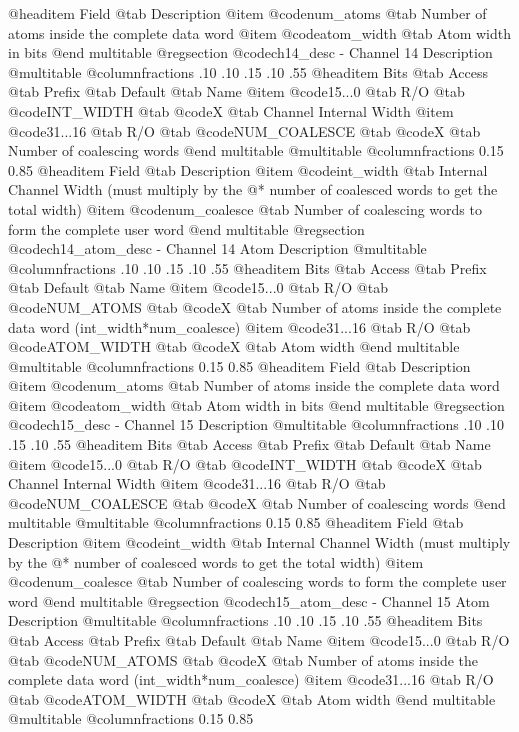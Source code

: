 @headitem Field @tab Description
@item @code{num_atoms} @tab Number of atoms inside the complete data word
@item @code{atom_width} @tab Atom width in bits
@end multitable
@regsection @code{ch14_desc} - Channel 14 Description
@multitable @columnfractions .10 .10 .15 .10 .55
@headitem Bits @tab Access @tab Prefix @tab Default @tab Name
@item @code{15...0}
@tab R/O @tab
@code{INT_WIDTH}
@tab @code{X} @tab 
Channel Internal Width
@item @code{31...16}
@tab R/O @tab
@code{NUM_COALESCE}
@tab @code{X} @tab 
Number of coalescing words
@end multitable
@multitable @columnfractions 0.15 0.85
@headitem Field @tab Description
@item @code{int_width} @tab Internal Channel Width (must multiply by the @* number of coalesced words to get the total width)
@item @code{num_coalesce} @tab Number of coalescing words to form the complete user word
@end multitable
@regsection @code{ch14_atom_desc} - Channel 14 Atom Description
@multitable @columnfractions .10 .10 .15 .10 .55
@headitem Bits @tab Access @tab Prefix @tab Default @tab Name
@item @code{15...0}
@tab R/O @tab
@code{NUM_ATOMS}
@tab @code{X} @tab 
Number of atoms inside the complete data word (int_width*num_coalesce)
@item @code{31...16}
@tab R/O @tab
@code{ATOM_WIDTH}
@tab @code{X} @tab 
Atom width
@end multitable
@multitable @columnfractions 0.15 0.85
@headitem Field @tab Description
@item @code{num_atoms} @tab Number of atoms inside the complete data word
@item @code{atom_width} @tab Atom width in bits
@end multitable
@regsection @code{ch15_desc} - Channel 15 Description
@multitable @columnfractions .10 .10 .15 .10 .55
@headitem Bits @tab Access @tab Prefix @tab Default @tab Name
@item @code{15...0}
@tab R/O @tab
@code{INT_WIDTH}
@tab @code{X} @tab 
Channel Internal Width
@item @code{31...16}
@tab R/O @tab
@code{NUM_COALESCE}
@tab @code{X} @tab 
Number of coalescing words
@end multitable
@multitable @columnfractions 0.15 0.85
@headitem Field @tab Description
@item @code{int_width} @tab Internal Channel Width (must multiply by the @* number of coalesced words to get the total width)
@item @code{num_coalesce} @tab Number of coalescing words to form the complete user word
@end multitable
@regsection @code{ch15_atom_desc} - Channel 15 Atom Description
@multitable @columnfractions .10 .10 .15 .10 .55
@headitem Bits @tab Access @tab Prefix @tab Default @tab Name
@item @code{15...0}
@tab R/O @tab
@code{NUM_ATOMS}
@tab @code{X} @tab 
Number of atoms inside the complete data word (int_width*num_coalesce)
@item @code{31...16}
@tab R/O @tab
@code{ATOM_WIDTH}
@tab @code{X} @tab 
Atom width
@end multitable
@multitable @columnfractions 0.15 0.85
